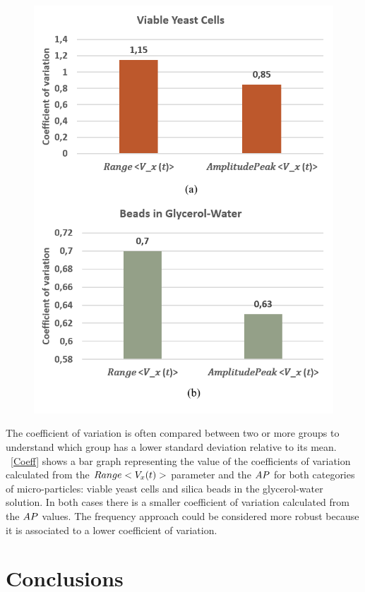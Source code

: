\documentclass[journal]{IEEEtran}
\theoremstyle{definition}
\theoremstyle{remark}
\begin{document}
\begin{figure}[t]
	\centering
	\includegraphics[width=1\columnwidth]{images/Coeff}
\end{figure}

The coefficient of variation is often compared between two or more groups to understand which group has a lower standard deviation relative to its mean. 
~\fig\ref{Coeff} shows a bar graph representing the value of the coefficients of variation calculated from the $Range<V_x(t)>$ parameter and the $AP$ for both categories of micro-particles: viable yeast cells and silica beads in the glycerol-water solution. 
In both cases there is a smaller coefficient of variation calculated from the $AP$ values. The frequency approach could be considered more robust because it is associated to a lower coefficient of variation.

\section{Conclusions}



%
\end{document}
